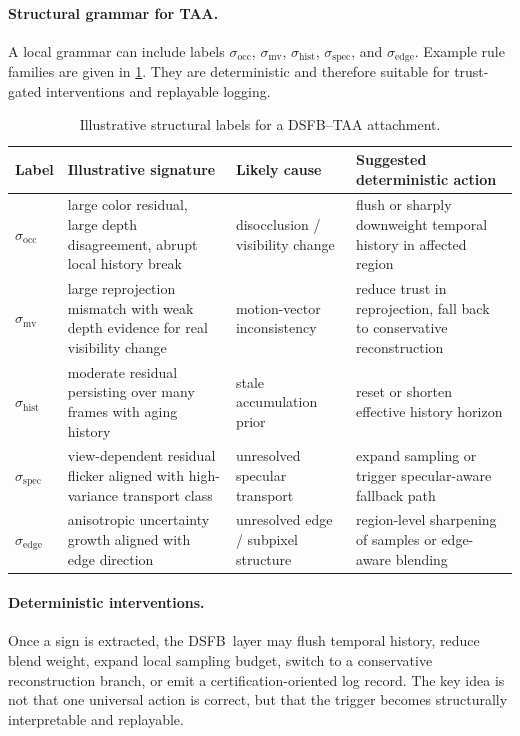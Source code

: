 \documentclass[11pt]{article}
\newcommand{\dsfb}{\textsc{DSFB}}
\theoremstyle{definition}
\theoremstyle{plain}
\begin{document}
\paragraph{Structural grammar for TAA.}
A local grammar can include labels $\sigma_{\mathrm{occ}}$, $\sigma_{\mathrm{mv}}$, $\sigma_{\mathrm{hist}}$, $\sigma_{\mathrm{spec}}$, and $\sigma_{\mathrm{edge}}$. Example rule families are given in \cref{tab:taa_rules}. They are deterministic and therefore suitable for trust-gated interventions and replayable logging.

\begin{table}[H]
\centering
\caption{Illustrative structural labels for a \dsfb--TAA attachment.}
\label{tab:taa_rules}
\begin{tabularx}{\textwidth}{>{\raggedright\arraybackslash}p{} >{\raggedright\arraybackslash}p{} >{\raggedright\arraybackslash}p{} >{\raggedright\arraybackslash}X}
\toprule
\textbf{Label} & \textbf{Illustrative signature} & \textbf{Likely cause} & \textbf{Suggested deterministic action} \\
\midrule
$\sigma_{\mathrm{occ}}$ & large color residual, large depth disagreement, abrupt local history break & disocclusion / visibility change & flush or sharply downweight temporal history in affected region \\
$\sigma_{\mathrm{mv}}$ & large reprojection mismatch with weak depth evidence for real visibility change & motion-vector inconsistency & reduce trust in reprojection, fall back to conservative reconstruction \\
$\sigma_{\mathrm{hist}}$ & moderate residual persisting over many frames with aging history & stale accumulation prior & reset or shorten effective history horizon \\
$\sigma_{\mathrm{spec}}$ & view-dependent residual flicker aligned with high-variance transport class & unresolved specular transport & expand sampling or trigger specular-aware fallback path \\
$\sigma_{\mathrm{edge}}$ & anisotropic uncertainty growth aligned with edge direction & unresolved edge / subpixel structure & region-level sharpening of samples or edge-aware blending \\
\bottomrule
\end{tabularx}
\end{table}

\paragraph{Deterministic interventions.}
Once a sign is extracted, the \dsfb\ layer may flush temporal history, reduce blend weight, expand local sampling budget, switch to a conservative reconstruction branch, or emit a certification-oriented log record. The key idea is not that one universal action is correct, but that the trigger becomes structurally interpretable and replayable.
\end{document}
